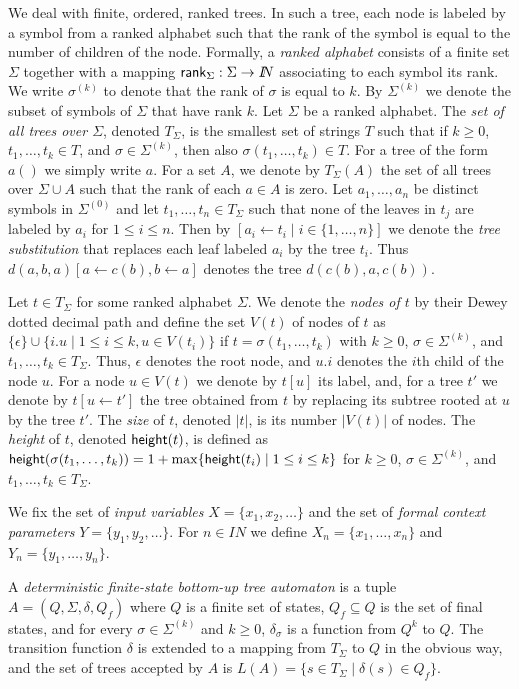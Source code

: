 \documentclass[copyright,creativecommons]{eptcs}
\newcommand{\height}[1]{{\sf height}(#1)}
\newcommand{\nat}{I\!\!N}
\def\rank{{\sf rank}}
\def\rank{{\sf rank}}
\begin{document}
We deal with finite, ordered, ranked trees.
In such a tree, each node is labeled by a symbol from
a ranked alphabet such that the rank of the symbol is equal
to the number of children of the node.
Formally, a \emph{ranked alphabet} consists of a finite set $\Sigma$
together with a mapping $\rank_\Sigma:\Sigma\to\nat$ associating
to each symbol its rank. 
We write $\sigma^{(k)}$ to denote that the rank of $\sigma$ is equal to $k$.
By $\Sigma^{(k)}$ we denote the subset of symbols of $\Sigma$ that have
rank $k$.
Let $\Sigma$ be a ranked alphabet.
The \emph{set of all trees over $\Sigma$},
denoted $T_\Sigma$, is the smallest set of strings $T$ such that if
$k\geq 0$, $t_1,\dots, t_k\in T$, and $\sigma\in\Sigma^{(k)}$, then also
$\sigma(t_1,\dots,t_k)\in T$.
For a tree of the form $a()$ we simply write $a$.
For a set $A$, we denote by $T_\Sigma(A)$ the set of all trees over
$\Sigma\cup A$ such that the rank of each $a\in A$ is zero.
Let $a_1,\dots,a_n$ be distinct symbols in $\Sigma^{(0)}$ and 
let $t_1,\dots,t_n\in T_\Sigma$ such that none of the leaves in $t_j$ are
labeled by $a_i$ for $1\leq i\leq n$.
Then by $[a_i\leftarrow t_i\mid i\in\{1,\dots,n\}]$
we denote the \emph{tree substitution} that replaces each leaf labeled
$a_i$ by the tree $t_i$.
Thus $d(a,b,a)[a\leftarrow c(b), b\leftarrow a]$ denotes the tree
$d(c(b),a,c(b))$.

Let $t\in T_\Sigma$ for some ranked alphabet $\Sigma$.
We denote the \emph{nodes of $t$} by their Dewey dotted decimal path and
define the set $V(t)$ of nodes of $t$ as
$\{\epsilon\}\cup \{i.u\mid 1\leq i\leq k, u\in V(t_i)\}$
if $t=\sigma(t_1,\dots,t_k)$ with $k\geq 0$, $\sigma\in\Sigma^{(k)}$, and
$t_1,\dots, t_k\in T_\Sigma$. Thus, $\epsilon$ denotes the root node,
and $u.i$ denotes the $i$th child of the node $u$.
For a node $u\in V(t)$ we denote by $t[u]$ its label, and,
for a tree $t'$ we denote by $t[u\leftarrow t']$ 
the tree obtained from $t$ by replacing its subtree rooted at $u$
by the tree $t'$.
The \emph{size} of $t$, denoted $|t|$, is its number $|V(t)|$ of nodes.
The \emph{height} of $t$, denoted $\height{t}$, is defined as
$\height{\sigma(t_1,\dots,t_k)}=1+\max\{\height{t_i}\mid 1\leq i\leq k\}$ for
$k\geq 0$, 
$\sigma\in\Sigma^{(k)}$, 
and $t_1,\dots,t_k\in T_\Sigma$.

We fix the set of \emph{input variables} $X=\{x_1,x_2,\dots\}$ and the set
of \emph{formal context parameters} $Y=\{y_1,y_2,\dots\}$. 
For $n\in\nat$ we define $X_n=\{x_1,\dots,x_n\}$ and $Y_n=\{y_1,\dots, y_n\}$.

A \emph{deterministic finite-state bottom-up tree automaton} is a tuple
$A=(Q,\Sigma,\delta,Q_f)$ where $Q$ is a finite set of states, 
$Q_f\subseteq Q$ is the set of final states, and for every $\sigma\in\Sigma^{(k)}$
and $k\geq 0$, $\delta_\sigma$ is a function from $Q^k$ to $Q$.
The transition function $\delta$ is extended to a mapping from $T_\Sigma$ to $Q$ in 
the obvious way, and the set of trees accepted by $A$ is
$L(A)=\{s\in T_\Sigma\mid \delta(s)\in Q_f\}$.
\end{document}
